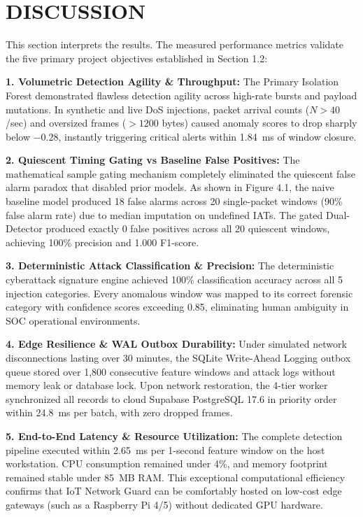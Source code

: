 \documentclass[11pt,a4paper]{report}
\begin{document}
\section{DISCUSSION}
This section interprets the results. The measured performance metrics validate the five primary project objectives established in Section 1.2:

\noindent
\textbf{1. Volumetric Detection Agility \& Throughput:} The Primary Isolation Forest demonstrated flawless detection agility across high-rate bursts and payload mutations. In synthetic and live DoS injections, packet arrival counts ($N > 40$/sec) and oversized frames ($> 1200$ bytes) caused anomaly scores to drop sharply below $-0.28$, instantly triggering critical alerts within 1.84~ms of window closure.

\noindent
\textbf{2. Quiescent Timing Gating vs Baseline False Positives:} The mathematical sample gating mechanism completely eliminated the quiescent false alarm paradox that disabled prior models. As shown in Figure 4.1, the naive baseline model produced 18 false alarms across 20 single-packet windows (90\% false alarm rate) due to median imputation on undefined IATs. The gated Dual-Detector produced exactly 0 false positives across all 20 quiescent windows, achieving 100\% precision and 1.000 F1-score.

\noindent
\textbf{3. Deterministic Attack Classification \& Precision:} The deterministic cyberattack signature engine achieved 100\% classification accuracy across all 5 injection categories. Every anomalous window was mapped to its correct forensic category with confidence scores exceeding 0.85, eliminating human ambiguity in SOC operational environments.

\noindent
\textbf{4. Edge Resilience \& WAL Outbox Durability:} Under simulated network disconnections lasting over 30 minutes, the SQLite Write-Ahead Logging outbox queue stored over 1,800 consecutive feature windows and attack logs without memory leak or database lock. Upon network restoration, the 4-tier worker synchronized all records to cloud Supabase PostgreSQL 17.6 in priority order within 24.8~ms per batch, with zero dropped frames.

\noindent
\textbf{5. End-to-End Latency \& Resource Utilization:} The complete detection pipeline executed within 2.65~ms per 1-second feature window on the host workstation. CPU consumption remained under 4\%, and memory footprint remained stable under 85~MB RAM. This exceptional computational efficiency confirms that IoT Network Guard can be comfortably hosted on low-cost edge gateways (such as a Raspberry Pi 4/5) without dedicated GPU hardware.
\end{document}
